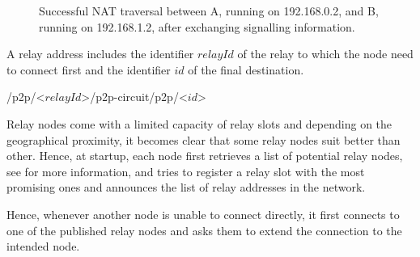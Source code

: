 \begin{figure}[H]
    \label{fig:successful-nat-traversal}
    \caption{Successful NAT traversal between A, running on 192.168.0.2, and B, running on 192.168.1.2, after exchanging signalling information.}
\end{figure}

A relay address includes the identifier $relayId$ of the relay to which the node need to connect first and the identifier $id$ of the final destination.

\begin{center}
    \textsf{/p2p/}\textless\textsf{$relayId$}\textgreater\textsf{/p2p-circuit/p2p/}\textless{}\textsf{$id$}\textgreater{}
\end{center}

Relay nodes come with a limited capacity of relay slots and depending on the geographical proximity, it becomes clear that some relay nodes suit better than other. Hence, at startup, each node first retrieves a list of potential relay nodes, see  for more information, and tries to register a relay slot with the most promising ones and announces the list of relay addresses in the network.

Hence, whenever another node is unable to connect directly, it first connects to one of the published relay nodes and asks them to extend the connection to the intended node.